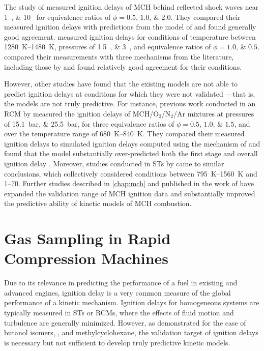 \documentclass[../main.tex]{subfiles}
\begin{document}
The study of \textcite{Rotavera2013} measured ignition delays of MCH behind
reflected shock waves near \SIlist{1;10}{\atmosphere} for equivalence
ratios of $\phi = \numlist{0.5;1.0;2.0}$. They compared their measured ignition
delays with predictions from the model of \textcite{Pitz2007} and found
generally good agreement. \textcite{Hong2011} measured ignition delays
for conditions of temperature between \SIrange{1280}{1480}{\kelvin}, pressures
of \SIlist{1.5;3}{\atmosphere}, and equivalence ratios of $\phi = \numlist{1.0;0.5}$.
\textcite{Hong2011} compared their measurements with three mechanisms
from the literature, including those by \textcite{Pitz2007, Orme2006}
and found relatively good agreement for their conditions.

However, other studies have found that the existing models are not able
to predict ignition delays at conditions for which they were not validated%
---that is, the models are not truly predictive. For instance, previous work
conducted in an RCM by \textcite{Mittal2009} measured the ignition delays
of MCH/O$_2$/N$_2$/Ar mixtures at pressures of \SIlist{15.1;25.5}{\bar},
for three equivalence ratios of $\phi = \numlist{0.5;1.0;1.5}$, and over
the temperature range of \SIrange{680}{840}{\kelvin}. They compared
their measured ignition delays to simulated ignition delays computed
using the mechanism of \textcite{Pitz2007} and found that the model
substantially over-predicted both the first stage and overall ignition delay
\cite{Mittal2009}. Moreover, studies conducted in STs by
\textcite{Vasu2009, Vanderover2009} came to similar conclusions, which
collectively considered conditions between \SIrange{795}{1560}{\kelvin}
and \SIrange{1}{70}{\atmosphere}. Further studies described in \cref{chap:mch}
and published in the work of \textcite{Weber2014} have expanded the
validation range of MCH ignition data and substantially improved the
predictive ability of kinetic models of MCH combustion.

\section{Gas Sampling in Rapid Compression Machines}

Due to its relevance in predicting the performance of a fuel in existing
and advanced engines, ignition delay is a very common measure of the
global performance of a kinetic mechanism. Ignition delays for homogeneous
systems are typically measured in STs or RCMs, where the effects
of fluid motion and turbulence are generally minimized. However, as demonstrated
for the case of butanol isomers, \iPeOH{}, and methylcyclohexane, the
validation target of ignition delays is necessary but not sufficient to
develop truly predictive kinetic models.
\end{document}
